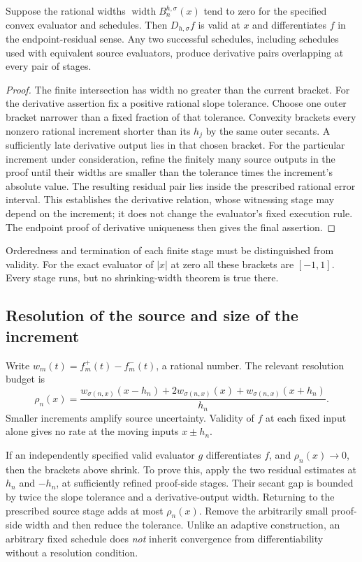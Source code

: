 \begin{theorem}
\label{thm:fixed-schedule-derivative}
Suppose the rational widths
$\operatorname{width}B_n^{h,\sigma}(x)$ tend to zero for the specified
convex evaluator and schedules.  Then $D_{h,\sigma}f$ is valid at $x$
and differentiates $f$ in the endpoint-residual sense.  Any two successful
schedules, including schedules used with equivalent source evaluators,
produce derivative pairs overlapping at every pair of stages.
\end{theorem}
\begin{proof}
The finite intersection has width no greater than the current bracket.
For the derivative assertion fix a positive rational slope tolerance.
Choose one outer bracket narrower than a fixed fraction of that tolerance.
Convexity brackets every nonzero rational increment shorter than its $h_j$
by the same outer secants.  A sufficiently late derivative output lies in
that chosen bracket.  For the particular increment under consideration,
refine the finitely many source outputs in the proof until their widths
are smaller than the tolerance times the increment's absolute value.
The resulting residual pair lies inside the prescribed rational error
interval.  This establishes the derivative relation, whose witnessing
stage may depend on the increment; it does not change the evaluator's
fixed execution rule.  The endpoint proof of derivative uniqueness then
gives the final assertion.
\end{proof}

Orderedness and termination of each finite stage must be distinguished from
validity.  For the exact evaluator of $|x|$ at zero all these brackets are
$[-1,1]$.  Every stage runs, but no shrinking-width theorem is true there.

\subsection{Resolution of the source and size of the increment}
Write $w_m(t)=f_m^+(t)-f_m^-(t)$, a rational number.  The relevant
resolution budget is
\[
 \rho_n(x)=\frac{
 w_{\sigma(n,x)}(x-h_n)+2w_{\sigma(n,x)}(x)
                 +w_{\sigma(n,x)}(x+h_n)}{h_n}.
\]
Smaller increments amplify source uncertainty.  Validity of $f$ at each
fixed input alone gives no rate at the moving inputs $x\pm h_n$.

If an independently specified valid evaluator $g$ differentiates $f$,
and $\rho_n(x)\to0$, then the brackets above shrink.  To prove this,
apply the two residual estimates at $h_n$ and $-h_n$, at sufficiently
refined proof-side stages.  Their secant gap is bounded by twice the
slope tolerance and a derivative-output width.  Returning to the prescribed
source stage adds at most $\rho_n(x)$.  Remove the arbitrarily small
proof-side width and then reduce the tolerance.  Unlike an adaptive
construction, an arbitrary fixed schedule does \emph{not} inherit
convergence from differentiability without a resolution condition.

